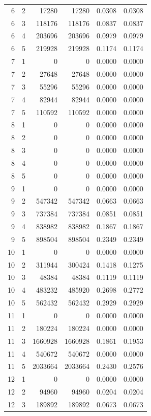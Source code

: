 \begin{longtable}{rrrrrr}
6 & 2 & 17280 & 17280 & 0.0308 & 0.0308 \\
6 & 3 & 118176 & 118176 & 0.0837 & 0.0837 \\
6 & 4 & 203696 & 203696 & 0.0979 & 0.0979 \\
6 & 5 & 219928 & 219928 & 0.1174 & 0.1174 \\
7 & 1 & 0 & 0 & 0.0000 & 0.0000 \\
7 & 2 & 27648 & 27648 & 0.0000 & 0.0000 \\
7 & 3 & 55296 & 55296 & 0.0000 & 0.0000 \\
7 & 4 & 82944 & 82944 & 0.0000 & 0.0000 \\
7 & 5 & 110592 & 110592 & 0.0000 & 0.0000 \\
8 & 1 & 0 & 0 & 0.0000 & 0.0000 \\
8 & 2 & 0 & 0 & 0.0000 & 0.0000 \\
8 & 3 & 0 & 0 & 0.0000 & 0.0000 \\
8 & 4 & 0 & 0 & 0.0000 & 0.0000 \\
8 & 5 & 0 & 0 & 0.0000 & 0.0000 \\
9 & 1 & 0 & 0 & 0.0000 & 0.0000 \\
9 & 2 & 547342 & 547342 & 0.0663 & 0.0663 \\
9 & 3 & 737384 & 737384 & 0.0851 & 0.0851 \\
9 & 4 & 838982 & 838982 & 0.1867 & 0.1867 \\
9 & 5 & 898504 & 898504 & 0.2349 & 0.2349 \\
10 & 1 & 0 & 0 & 0.0000 & 0.0000 \\
10 & 2 & 311944 & 300424 & 0.1418 & 0.1275 \\
10 & 3 & 48384 & 48384 & 0.1119 & 0.1119 \\
10 & 4 & 483232 & 485920 & 0.2698 & 0.2772 \\
10 & 5 & 562432 & 562432 & 0.2929 & 0.2929 \\
11 & 1 & 0 & 0 & 0.0000 & 0.0000 \\
11 & 2 & 180224 & 180224 & 0.0000 & 0.0000 \\
11 & 3 & 1660928 & 1660928 & 0.1861 & 0.1953 \\
11 & 4 & 540672 & 540672 & 0.0000 & 0.0000 \\
11 & 5 & 2033664 & 2033664 & 0.2430 & 0.2576 \\
12 & 1 & 0 & 0 & 0.0000 & 0.0000 \\
12 & 2 & 94960 & 94960 & 0.0204 & 0.0204 \\
12 & 3 & 189892 & 189892 & 0.0673 & 0.0673 \\

\end{longtable}
